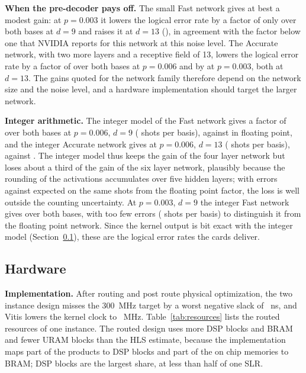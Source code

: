 \textbf{When the pre-decoder pays off.} The small Fast network gives at best a modest gain: at $p=0.003$ it lowers the
logical error rate by a factor of only \NumRatioFastFpNineLow{} over both bases at $d=9$ and raises it at $d=13$
(\NumRatioFastFpThirteenLow{}), in agreement with the factor below one that NVIDIA reports for this network at this
noise level. The Accurate network, with two more layers and a receptive field
of 13, lowers the logical error rate by a factor of \NumRatioAccFpThirteenHigh{} over both bases at $p=0.006$ and by
\NumRatioAccFpThirteenLow{} at $p=0.003$, both at $d=13$. The gains quoted for the network family therefore depend on
the network size and the noise level, and a hardware implementation should target the larger network.

\textbf{Integer arithmetic.} The integer model of the Fast network gives a factor of \NumRatioFastIntNineHigh{} over
both bases at $p=0.006$, $d=9$ (\NumShotsFastIntNineHigh{} shots per basis), against \NumRatioFastFpNineHigh{} in
floating point, and the integer Accurate network gives \NumRatioAccIntThirteenHigh{} at $p=0.006$, $d=13$
(\NumShotsAccIntThirteenHigh{} shots per basis), against \NumRatioAccFpThirteenHigh{}. The integer model thus keeps
the gain of the four layer network but loses about a third of the gain of the six layer network, plausibly because the rounding of
the activations accumulates over five hidden layers; with \NumIntAccAfter{} errors against \NumIntAccExpected{}
expected on the same shots from the floating point factor, the loss is well outside the counting uncertainty. At $p=0.003$, $d=9$ the integer Fast network gives
\NumRatioFastIntNineLow{} over both bases, with too few errors (\NumShotsFastIntNineLow{} shots per basis) to
distinguish it from the floating point network. Since the kernel output is bit exact with the integer model
(Section~\ref{sec:hw}), these are the logical error rates the cards deliver.

\subsection{Hardware}\label{sec:hw}

\textbf{Implementation.} After routing and post route physical optimization, the two instance design misses the
300~MHz target by a worst negative slack of \NumWns{}~ns, and Vitis lowers the kernel clock to \NumKernelMhz{}~MHz. Table~\ref{tab:resources} lists the routed resources of one
instance. The routed design uses more DSP blocks and BRAM and fewer URAM blocks than the HLS estimate, because the
implementation maps part of the products to DSP blocks and part of the on chip memories to BRAM; DSP blocks are the
largest share, at less than half of one SLR.

